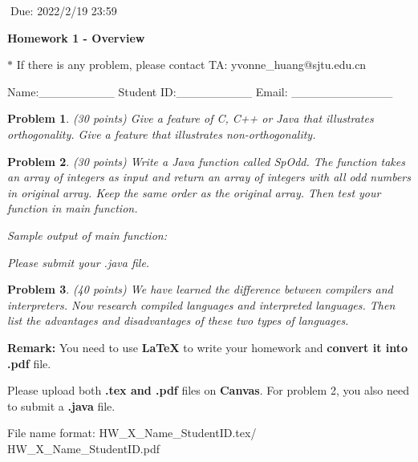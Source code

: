 \documentclass[12pt]{article}
\newtheorem{hw}{Problem}
\newenvironment{sol}
  {\par\vspace{3mm}\noindent{\it Solution}.}
  {\qed}
\begin{document}
$\;$\hfill Due: 2022/2/19 23:59

\begin{center}
{\LARGE\bf Homework 1 - Overview}
\end{center}

\begin{center}
	\footnotesize{\color{red}$*$ If there is any problem, please contact TA: yvonne\_huang@sjtu.edu.cn}

	\footnotesize{\color{blue} \quad Name:\_\_\_\_\_\_\_\_\_  \quad Student ID:\_\_\_\_\_\_\_\_\_ \quad Email: \_\_\_\_\_\_\_\_\_\_\_\_}
\end{center}

\begin{hw}\rm (30 points)
	Give a feature of C, C++ or Java that illustrates orthogonality. Give a feature that illustrates non-orthogonality.
\end{hw}


\begin{hw}\rm (30 points)
	Write a Java function called \textit{SpOdd}. The function takes an array of integers as input and return an array of integers with all odd numbers in original array. Keep the same order as the original array. Then test your function in main function.
	
Sample output of main function:

Please submit your .java file.

\end{hw}


\begin{hw}\rm (40 points)
We have learned the difference between compilers and interpreters. 
Now research compiled languages and interpreted languages. Then list the advantages 
and disadvantages of these two types of languages.
\end{hw}


\vspace{20pt}

\textbf{Remark:} 
You need to use \textbf{LaTeX} to write your homework and \textbf{convert it into .pdf} file.

Please upload both \textbf{.tex and .pdf} files on \textbf{Canvas}. For problem 2, you also need to submit a \textbf{.java} file.

File name format: {\color{red} HW\_X\_Name\_StudentID.tex/\color{red} HW\_X\_Name\_StudentID.pdf}
\end{document}
